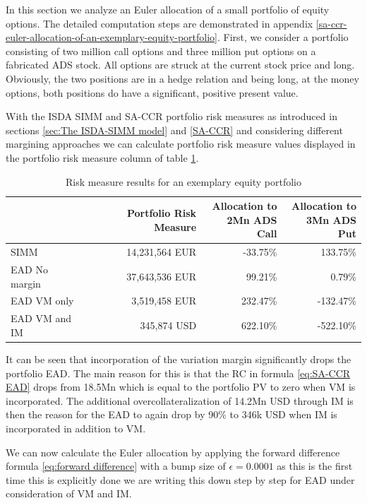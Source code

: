 \documentclass[../Thesis_AHoecherl.tex]{subfiles}
\begin{document}
    In this section we analyze an Euler allocation of a small portfolio of equity options. The detailed computation steps are demonstrated in appendix \ref{sa-ccr-euler-allocation-of-an-exemplary-equity-portfolio}. 
    First, we consider a portfolio consisting of two million call options and three million put options on a fabricated ADS stock. All options are struck at the current stock price and long. Obviously, the two positions are in a hedge relation and being long, at the money options, both positions do have a significant, positive present value. 
    
    With the \gls{ISDA SIMM} and \gls{SA-CCR} portfolio risk measures as introduced in sections \ref{sec:The ISDA-SIMM model} and \ref{SA-CCR} and considering different margining approaches we can calculate portfolio risk measure values displayed in the portfolio risk measure column of table \ref{tab:2TradeEquityResults}.
    \begin{table}[htbp]
        \centering
        \begin{tabular}{l||r|r|r}
            & Portfolio Risk Measure & \makecell{Allocation to \\ 2Mn ADS Call} & \makecell{Allocation to \\ 3Mn ADS Put} \\
                \toprule
        SIMM  & 14,231,564 EUR & -33.75\% & 133.75\%  \\
        \gls{EAD} No margin & 37,643,536 EUR & 99.21\% & 0.79\%  \\
        \gls{EAD} \gls{VM} only & 3,519,458 EUR & 232.47\% & -132.47\%  \\
        \gls{EAD} \gls{VM} and \gls{IM} & 345,874 USD  & 622.10\% & -522.10\% \\
        \end{tabular}%
        \caption{Risk measure results for an exemplary equity portfolio}
        \label{tab:2TradeEquityResults}%
    \end{table}%
    It can be seen that incorporation of the variation margin significantly drops the portfolio EAD. The main reason for this is that the RC in formula \ref{eq:SA-CCR EAD} drops from 18.5Mn which is equal to the portfolio \gls{PV} to zero when \gls{VM} is incorporated.
    The additional overcollateralization of 14.2Mn USD through \gls{IM} is then the reason for the \gls{EAD} to again drop by 90\% to 346k USD when \gls{IM} is incorporated in addition to \gls{VM}.

    We can now calculate the Euler allocation by applying the forward difference formula \ref{eq:forward difference} with a bump size of $\epsilon = 0.0001$ as this is the first time this is explicitly done we are writing this down step by step for \gls{EAD} under consideration of \gls{VM} and IM.
\end{document}
